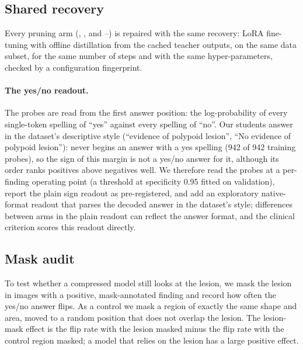 \subsection{Shared recovery}
Every pruning arm (, ,  and --)
is repaired with the same recovery: LoRA fine-tuning with offline distillation from
the cached teacher outputs, on the same data subset, for the same number of steps
and with the same hyper-parameters, checked by a configuration fingerprint.

\paragraph{The yes/no readout.} The probes are read from the first answer position: the
log-probability of every single-token spelling of ``yes'' against every spelling of ``no''.
Our students answer in the dataset's descriptive style (``evidence of polypoid lesion'', ``No
evidence of polypoid lesion''):  never begins an answer with a yes spelling (942 of
942 training probes), so the sign of this margin is not a yes/no answer for it, although its
order ranks positives above negatives well. We therefore read the probes at a per-finding
operating point (a threshold at specificity 0.95 fitted on validation), report the plain sign
readout as pre-registered, and add an exploratory native-format readout that parses the decoded
answer in the dataset's style; differences between arms in the plain readout can reflect the
answer format, and the clinical criterion scores this readout directly.

\subsection{Mask audit}
To test whether a compressed model still looks at the lesion, we mask the lesion in
images with a positive, mask-annotated finding and record how often the yes/no
answer flips. As a control we mask a region of exactly the same shape and area,
moved to a random position that does not overlap the lesion. The lesion-mask
effect is the flip rate with the lesion masked minus the flip rate with the control
region masked; a model that relies on the lesion has a large positive effect.
